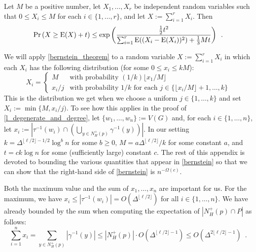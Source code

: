 \documentclass{patmorin}
\begin{document}
\begin{thm}\label{bernstein_theorem}
  Let $M$ be a positive number, let $X_1,\ldots,X_r$ be independent random variables such that $0\le X_i\le M$ for each $i\in\{1,\ldots,r\}$, and let $X:=\sum_{i=1}^r X_i$. Then
  \begin{equation}
    \Pr\left(X \ge \mathrm{E}(X)+ t\right)
      \le \exp\left(\frac{\tfrac{1}{2}t^2}{\sum_{i=1}^r \mathrm{E}((X_i-\mathrm{E}(X_i))^2)+\tfrac{1}{3}Mt}\right) \enspace . \label{bernstein}
  \end{equation}
\end{thm}
We will apply \cref{bernstein_theorem} to a random variable $X:=\sum_{i=1}^r X_i$ in which each $X_i$ has the following distribution (for some $0\le x_i\le kM$):
\[
  X_i = \begin{cases}
          M & \text{with probability $(1/k)\lfloor x_1/M\rfloor$} \\
          x_i/j & \text{with probability $1/k$ for each $j\in\{\lfloor x_i/M\rfloor+1,\ldots,k\}$}
        \end{cases}
\]
This is the distribution we get when we choose a uniform $j\in\{1,\ldots,k\}$ and set $X_i:=\min\{M,x_i/j)$.  To see how this applies in the proof of \cref{l_degenerate_and_degree}, let $\{w_1,\ldots,w_n\}:=V(G)$ and, for each $i\in\{1,\ldots,n\}$, let $x_i:=|\tau^{-1}(w_i)\cap\left(\bigcup_{y\in N^+_H(p)}\gamma^{-1}(y)\right)|$.  In our setting $k=\Delta^{\lfloor\ell/2\rfloor-1/2}\log^b n$ for some $b\ge 0$,  $M=a\Delta^{\lfloor\ell/2\rfloor}/k$ for some constant $a$, and $t=ck\log n$ for some (sufficiently large) constant $c$.  The rest of this appendix is devoted to bounding the various quantities that appear in \cref{bernstein} so that we can show that the right-hand side of \cref{bernstein} is $n^{-\Omega(c)}$.

Both the maximum value and the sum of $x_1,\ldots,x_n$ are important for us. For the maximum, we have $x_i\le|\tau^{-1}(w_i)|= O(\Delta^{\lfloor\ell/2\rfloor})$ for all $i\in\{1,\ldots,n\}$.  We have already bounded by the sum when computing the expectation of $|N_H^+(p)\cap P|$ as follows:
\[
  \sum_{i=1}^n x_i = \sum_{y\in N^+_H(p)} |\gamma^{-1}(y)|
  \le |N^+_H(p)|\cdot O(\Delta^{\lfloor\ell/2\rfloor-1})
  \le O(\Delta^{2\lfloor\ell/2\rfloor-1}) \enspace .
\]
\end{document}
